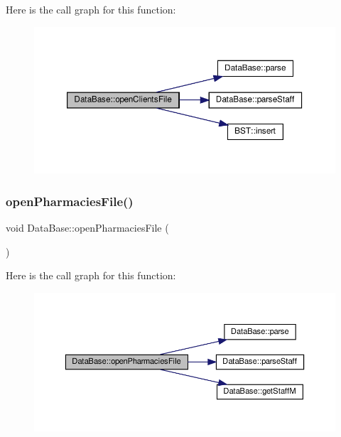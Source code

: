 Here is the call graph for this function\+:\nopagebreak
\begin{figure}[H]
\begin{center}
\leavevmode
\includegraphics[width=350pt]{classDataBase_a514959070d22346ea7ee212e51cab89f_cgraph}
\end{center}
\end{figure}
\mbox{\label{classDataBase_a30cd564502803b00dbe575b0bd9376e6}} 
\subsubsection{\texorpdfstring{open\+Pharmacies\+File()}{openPharmaciesFile()}}
{\footnotesize\ttfamily void Data\+Base\+::open\+Pharmacies\+File (\begin{DoxyParamCaption}{ }\end{DoxyParamCaption})}

Here is the call graph for this function\+:\nopagebreak
\begin{figure}[H]
\begin{center}
\leavevmode
\includegraphics[width=350pt]{classDataBase_a30cd564502803b00dbe575b0bd9376e6_cgraph}
\end{center}
\end{figure}
\mbox{\label{classDataBase_a10c16844e17eae108e828390a92fb3b8}} 
